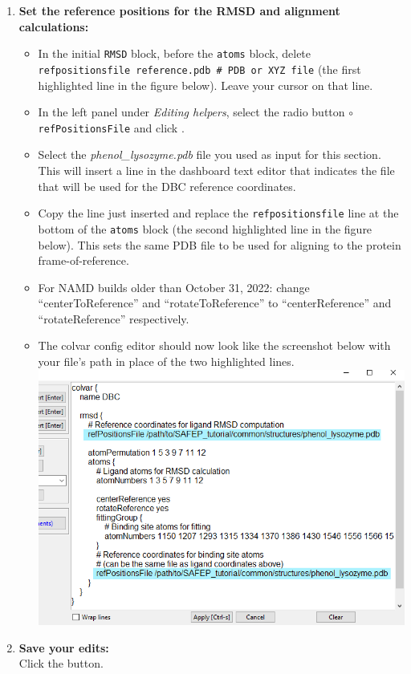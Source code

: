 \documentclass[9pt,tutorial]{Styling/livecoms}
\newcommand{\filepath}[1]{\textit{#1}}
\newcommand{\button}[1]{\inlineBox[gray]{\texttt{#1}}}
\newcommand{\menu}[1]{\textit{#1}}
\newcommand{\option}[1]{\texttt{#1}}
\newcommand{\textInput}[1]{\texttt{#1}}
\begin{document}
\begin{enumerate}
\begin{enumerate}[label=\alph*., ref=\theenumi.\alph*]
             \item \textbf{Set the reference positions for the RMSD and alignment calculations:} 
             \begin{itemize}
                 \item In the initial \textInput{RMSD} block, before the \textInput{atoms} block, delete \textInput{refpositionsfile reference.pdb \# PDB or XYZ file} (the first highlighted line in the figure below). Leave your cursor on that line.
                \item In the left panel under \menu{Editing helpers}, select the radio button \option{$\circ$  refPositionsFile} and click \button{Pick File}. 
                \item Select the \filepath{phenol\_lysozyme.pdb} file you used as input for this section. This will insert a line in the dashboard text editor that indicates the file that will be used for the DBC reference coordinates.
                \item Copy the line just inserted and replace the \textInput{refpositionsfile} line at the bottom of the \textInput{atoms} block (the second highlighted line in the figure below). This sets the same PDB file to be used for aligning to the protein frame-of-reference.
                \item For NAMD builds older than October 31, 2022: change ``centerToReference'' and ``rotateToReference'' to ``centerReference'' and ``rotateReference'' respectively.
                \item The colvar config editor should now look like the screenshot below with your file's path in place of the two highlighted lines.\\
                \includegraphics[width=0.75\linewidth ]{CV_dashboard_StepA.png} \label{fig:refposfiles}
            \end{itemize}
            \item \textbf{Save your edits:}\\
            Click the \button{Apply [Ctrl-s]} button.
        \end{enumerate}
        

\end{enumerate}
\end{document}
